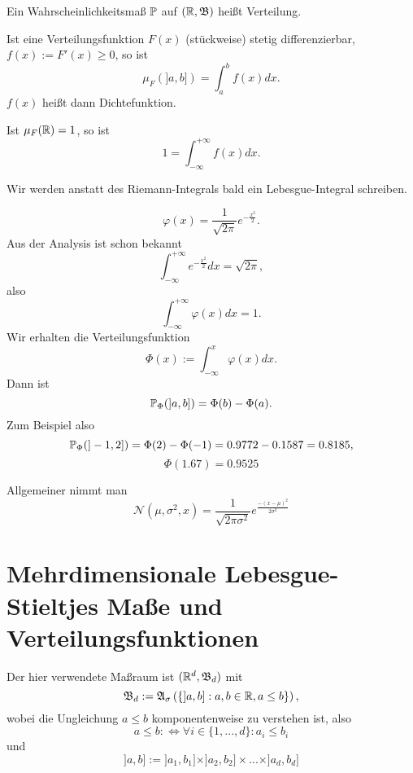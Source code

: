 			\begin{defi}
				Ein Wahrscheinlichkeitsmaß $\P$ auf $(\R,\mf{B})$ heißt Verteilung. 
			\end{defi}
			
			\begin{satz}
				Ist eine Verteilungsfunktion $F(x)$ (stückweise) stetig differenzierbar, $f(x):=F'(x)\ge0$, so ist
				\[ \mu_F(]a,b])=\int_{a}^{b} f(x)dx. \]
				$f(x)$ heißt dann Dichtefunktion. 
			\end{satz}
			
			\begin{bem}
				Ist $\mu_F(\R)=1$, so ist
				\[ 1=\int_{-\infty}^{+\infty} f(x)dx. \]
			\end{bem}
			
			\begin{bem}
				Wir werden anstatt des Riemann-Integrals bald ein Lebesgue-Integral schreiben.
			\end{bem}
			
			\begin{bsp} [Standardnormalverteilung]
				\[ \varphi(x)=\frac{1}{\sqrt{2\pi}}e^{-\frac{x^2}{2}}. \]
				Aus der Analysis ist schon bekannt
				\[ \int_{-\infty}^{+\infty}e^{-\frac{x^2}{2}}dx=\sqrt{2\pi}, \]
				also
				\[ \int_{-\infty}^{+\infty}\varphi(x)dx=1. \]
				Wir erhalten die Verteilungsfunktion
				\[ \Phi(x):=\int_{-\infty}^{x}\varphi(x)dx. \]
				Dann ist
				\[ \P_\Phi(]a,b])=\Phi(b)-\Phi(a). \]
				Zum Beispiel also 
				\[ \P_\Phi(]-1,2])=\Phi(2)-\Phi(-1)=0.9772-0.1587=0.8185, \]
				\[ \Phi(1.67)=0.9525 \]
			\end{bsp}
			
			\begin{bsp}
				Allgemeiner nimmt man 
				\[ \mathcal{N}(\mu,\sigma^2,x)=\frac{1}{\sqrt{2\pi \sigma^2}}e^\frac{-(x-\mu)^2}{2\sigma^2} \]
			\end{bsp}
			
		\section{Mehrdimensionale Lebesgue-Stieltjes Maße und Verteilungsfunktionen}
			Der hier verwendete Maßraum ist $(\R^d, \mf{B}_d)$ mit 
			\[ \mf{B}_d:=\mf{A}_\sigma\left(\{]a,b]: a,b\in\R, a\le b\}\right), \]
			wobei die Ungleichung $a\le b$ komponentenweise zu verstehen ist, also
			\[ a\le b:\Leftrightarrow\forall i\in\{1,...,d\}: a_i\le b_i \]
			und 
			\[ ]a,b]:=]a_1,b_1]\times]a_2,b_2]\times...\times]a_d,b_d] \]
			

